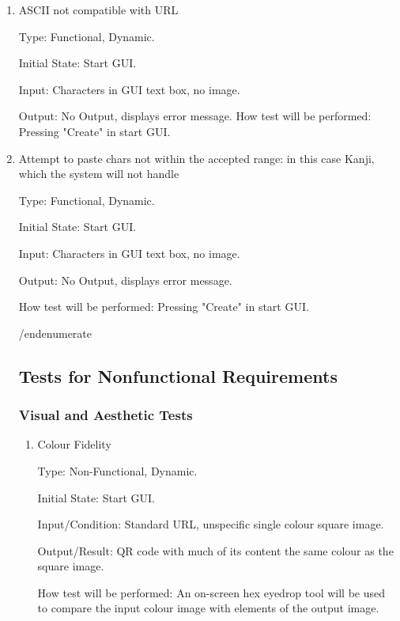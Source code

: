 \documentclass[12pt, titlepage]{article}
\begin{document}
\begin{enumerate}

\item{ASCII not compatible with URL\\}

Type: Functional, Dynamic.
					
Initial State: Start GUI.
					
Input: Characters in GUI text box, no image.
					
Output: No Output, displays error message.
How test will be performed: Pressing "Create" in start GUI.

\item{Attempt to paste chars not within the accepted range: in this case Kanji, which the system will not handle\\}

Type: Functional, Dynamic.
					
Initial State: Start GUI.
					
Input: Characters in GUI text box, no image.
					
Output: No Output, displays error message.
					
How test will be performed: Pressing "Create" in start GUI.

/end{enumerate} %

\subsection{Tests for Nonfunctional Requirements}

\subsubsection{Visual and Aesthetic Tests}

\begin{enumerate}

\item{Colour Fidelity\\}

Type: Non-Functional, Dynamic.
					
Initial State: Start GUI.
					
Input/Condition: Standard URL, unspecific single colour square image.
					
Output/Result: QR code with much of its content the same colour as the square image.
					
How test will be performed: An on-screen hex eyedrop tool will be used to compare the input colour image with elements of the output image.
					

\end{enumerate}
\end{enumerate}
\end{document}
